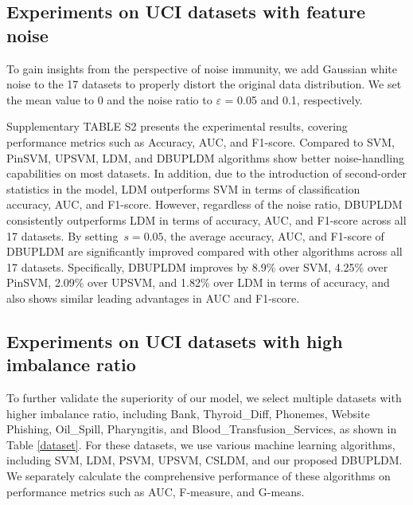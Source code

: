 \documentclass[a4paper]{cas-sc}
\begin{document}
\subsection{Experiments on UCI datasets with feature noise}
\label{5.1.3}
To gain insights from the perspective of noise immunity, we add Gaussian white noise to the 17 datasets to properly distort the original data distribution. We set the mean value to 0 and the noise ratio to $\varepsilon$ = 0.05 and 0.1, respectively.


{\color{orange}Supplementary TABLE S2 presents the experimental results, covering performance metrics such as Accuracy, AUC, and F1-score. } Compared to SVM, PinSVM, UPSVM, LDM, and DBUPLDM algorithms show better noise-handling capabilities on most datasets. {\color{orange}In addition, due to the introduction of second-order statistics in the model, LDM outperforms SVM in terms of classification accuracy, AUC, and F1-score. However, regardless of the noise ratio, DBUPLDM consistently outperforms LDM in terms of accuracy, AUC, and F1-score across all 17 datasets. By setting \(s = 0.05\), the average accuracy, AUC, and F1-score of DBUPLDM are significantly improved compared with other algorithms across all 17 datasets. Specifically, DBUPLDM improves by 8.9\% over SVM, 4.25\% over PinSVM, 2.09\% over UPSVM, and 1.82\% over LDM in terms of accuracy, and also shows similar leading advantages in AUC and F1-score.}



\subsection{Experiments on UCI datasets with high imbalance ratio}
\label{im_UCI}


To further validate the superiority of our model, we select multiple datasets with higher imbalance ratio, including Bank, Thyroid\_Diff, Phonemes, Website Phishing, Oil\_Spill, Pharyngitis, and Blood\_Transfusion\_Services, as shown in Table \ref{dataset}. For these datasets, we use various machine learning algorithms, including SVM, LDM, PSVM, UPSVM, CSLDM, and our proposed DBUPLDM. We separately calculate the comprehensive performance of these algorithms on performance metrics such as AUC, F-measure, and G-means.
\end{document}
